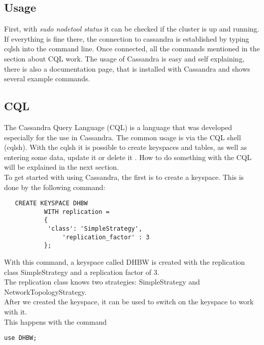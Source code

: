 \subsection{Usage}
First, with \textit{sudo nodetool status} it can be checked if the cluster is up and running. If everything is fine there, the connection to cassandra is established by  typing cqlsh into the command line. Once connected, all the commands mentioned in the section about CQL work. The usage of Cassandra is easy and self explaining, there is also a documentation page, that is installed with Cassandra and shows several example commands.

\subsection{CQL}
The Cassandra Query Language (CQL) is a language that was developed especially for the use in Cassandra. The common usage is via the CQL shell (cqlsh). With the cqlsh it is possible to create keyspaces and tables, as well as entering some data, update it or delete it \cite{cqlIntro}. How to do something with the CQL will be explained in the next section. \\
To get started with using Cassandra, the first is to create a keyspace. This is done by the following command:
 \begin{lstlisting}
   CREATE KEYSPACE DHBW
           WITH replication = 
           {
           	'class': 'SimpleStrategy', 
                'replication_factor' : 3
           };
 \end{lstlisting}
With this command, a keyspace called DHBW is created with the replication class SimpleStrategy and a replication factor of 3. \\
The replication class knows two strategies: SimpleStrategy and NetworkTopologyStrategy. \\
After we created the keyspace, it can be used to switch on the keyspace to work with it. \\This happens with the command
 \begin{lstlisting}
use DHBW;
 \end{lstlisting}
 
